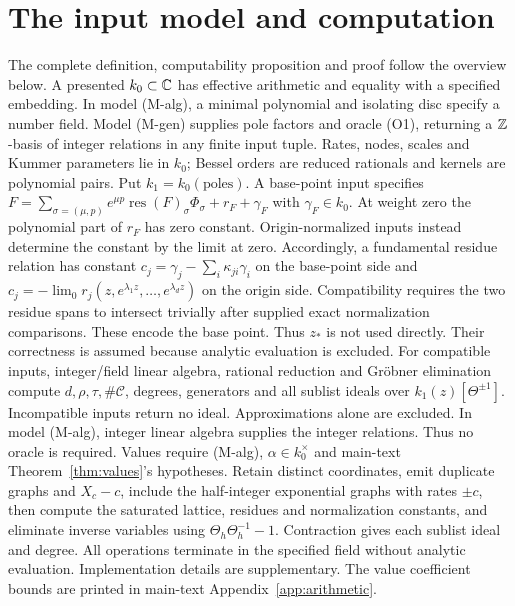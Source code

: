 \section{The input model and computation}\label{sup:input-model}
The complete definition, computability proposition and proof follow
the overview below.
A presented $k_0\subset\mathbb{C}$ has effective arithmetic and equality with a
specified embedding. In model (M-alg), a minimal polynomial and isolating
disc specify a number field. Model (M-gen) supplies pole factors and oracle (O1), returning
a $\mathbb{Z}$-basis of integer relations in any finite input tuple.
Rates, nodes, scales and Kummer parameters lie in $k_0$; Bessel orders
are reduced rationals and kernels are polynomial pairs. Put $k_1=k_0(\text{poles})$. A base-point input specifies
$F=\sum_{\sigma=(\mu,p)}e^{\mu p}\operatorname{res}(F)_\sigma\Phi_\sigma+r_F+\gamma_F$
with $\gamma_F\in k_0$. At weight zero the polynomial part of $r_F$ has zero
constant. Origin-normalized inputs instead determine the constant by the
limit at zero. Accordingly, a fundamental residue relation has constant
$c_j=\gamma_j-\sum_i\kappa_{ji}\gamma_i$ on the base-point side and
$c_j=-\lim_0r_j(z,e^{\lambda_1z},\ldots,e^{\lambda_dz})$ on the origin side.
Compatibility requires the two residue spans to intersect trivially after
supplied exact normalization comparisons. These encode the base point. Thus $z_*$ is not used directly. Their correctness is assumed because
analytic evaluation is excluded. For compatible inputs, integer/field
linear algebra, rational reduction and Gr\"obner elimination compute
$d,\rho,\tau,\#\mathcal C$, degrees, generators and all sublist ideals
over $k_1(z)[\Theta^{\pm1}]$. Incompatible inputs return no ideal. Approximations alone are excluded. In model (M-alg), integer linear
algebra supplies the integer relations. Thus no oracle is required.
Values require (M-alg), $\alpha\in k_0^\times$ and main-text Theorem~\ref{thm:values}'s
hypotheses. Retain distinct coordinates, emit duplicate graphs and $X_c-c$,
include the half-integer exponential graphs with rates $\pm c$, then compute
the saturated lattice, residues and normalization constants, and eliminate
inverse variables using $\Theta_h\Theta_h^{-1}-1$.
Contraction gives each sublist ideal and degree. All operations terminate
in the specified field without analytic evaluation. Implementation details
are supplementary. The value coefficient bounds are printed in
main-text Appendix~\ref{app:arithmetic}.

